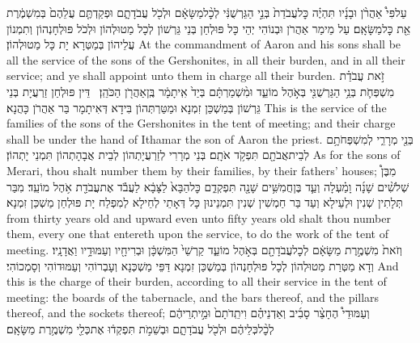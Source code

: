 {עַל\maqqaf פִּי֩ אַהֲרֹ֨ן וּבָנָ֜יו תִּהְיֶ֗ה כׇּל\maqqaf עֲבֹדַת֙ בְּנֵ֣י הַגֵּרְשֻׁנִּ֔י לְכׇ֨ל\maqqaf מַשָּׂאָ֔ם וּלְכֹ֖ל עֲבֹדָתָ֑ם וּפְקַדְתֶּ֤ם עֲלֵהֶם֙ בְּמִשְׁמֶ֔רֶת אֵ֖ת כׇּל\maqqaf מַשָּׂאָֽם׃}
{עַל מֵימַר אַהֲרֹן וּבְנוֹהִי יְהֵי כָּל פּוּלְחַן בְּנֵי גֵּרְשׁוֹן לְכָל מַטוּלְהוֹן וּלְכֹל פּוּלְחָנְהוֹן וְתִמְנוֹן עֲלֵיהוֹן בְּמַטְּרָא יָת כָּל מַטוּלְהוֹן׃}
{At the commandment of Aaron and his sons shall be all the service of the sons of the Gershonites, in all their burden, and in all their service; and ye shall appoint unto them in charge all their burden.}{}
{זֹ֣את עֲבֹדַ֗ת מִשְׁפְּחֹ֛ת בְּנֵ֥י הַגֵּרְשֻׁנִּ֖י בְּאֹ֣הֶל מוֹעֵ֑ד וּמִ֨שְׁמַרְתָּ֔ם בְּיַד֙ אִֽיתָמָ֔ר בֶּֽן\maqqaf אַהֲרֹ֖ן הַכֹּהֵֽן׃ \setuma }
{דֵּין פּוּלְחַן זַרְעֲיָת בְּנֵי גֵּרְשׁוֹן בְּמַשְׁכַּן זִמְנָא וּמַטַּרְתְּהוֹן בִּידָא דְּאִיתָמָר בַּר אַהֲרֹן כָּהֲנָא׃}
{This is the service of the families of the sons of the Gershonites in the tent of meeting; and their charge shall be under the hand of Ithamar the son of Aaron the priest.}{}
{בְּנֵ֖י מְרָרִ֑י לְמִשְׁפְּחֹתָ֥ם לְבֵית\maqqaf אֲבֹתָ֖ם תִּפְקֹ֥ד אֹתָֽם׃}
{בְּנֵי מְרָרִי לְזַרְעֲיָתְהוֹן לְבֵית אֲבָהָתְהוֹן תִּמְנֵי יָתְהוֹן׃}
{As for the sons of Merari, thou shalt number them by their families, by their fathers’ houses;}{}
{מִבֶּן֩ שְׁלֹשִׁ֨ים שָׁנָ֜ה וָמַ֗עְלָה וְעַ֛ד בֶּן\maqqaf חֲמִשִּׁ֥ים שָׁנָ֖ה תִּפְקְדֵ֑ם כׇּל\maqqaf הַבָּא֙ לַצָּבָ֔א לַעֲבֹ֕ד אֶת\maqqaf עֲבֹדַ֖ת אֹ֥הֶל מוֹעֵֽד׃}
{מִבַּר תְּלָתִין שְׁנִין וּלְעֵילָא וְעַד בַּר חַמְשִׁין שְׁנִין תִּמְנֵינוּן כָּל דְּאָתֵי לְחֵילָא לְמִפְלַח יָת פּוּלְחַן מַשְׁכַּן זִמְנָא׃}
{from thirty years old and upward even unto fifty years old shalt thou number them, every one that entereth upon the service, to do the work of the tent of meeting.}{}
{וְזֹאת֙ מִשְׁמֶ֣רֶת מַשָּׂאָ֔ם לְכׇל\maqqaf עֲבֹדָתָ֖ם בְּאֹ֣הֶל מוֹעֵ֑ד קַרְשֵׁי֙ הַמִּשְׁכָּ֔ן וּבְרִיחָ֖יו וְעַמּוּדָ֥יו וַאֲדָנָֽיו׃}
{וְדָא מַטְּרַת מַטוּלְהוֹן לְכָל פּוּלְחָנְהוֹן בְּמַשְׁכַּן זִמְנָא דַּפֵּי מַשְׁכְּנָא וְעָבְרוֹהִי וְעַמּוּדוֹהִי וְסָמְכוֹהִי׃}
{And this is the charge of their burden, according to all their service in the tent of meeting: the boards of the tabernacle, and the bars thereof, and the pillars thereof, and the sockets thereof;}{}
{וְעַמּוּדֵי֩ הֶחָצֵ֨ר סָבִ֜יב וְאַדְנֵיהֶ֗ם וִיתֵֽדֹתָם֙ וּמֵ֣יתְרֵיהֶ֔ם לְכׇ֨ל\maqqaf כְּלֵיהֶ֔ם וּלְכֹ֖ל עֲבֹדָתָ֑ם וּבְשֵׁמֹ֣ת תִּפְקְד֔וּ אֶת\maqqaf כְּלֵ֖י מִשְׁמֶ֥רֶת מַשָּׂאָֽם׃}
